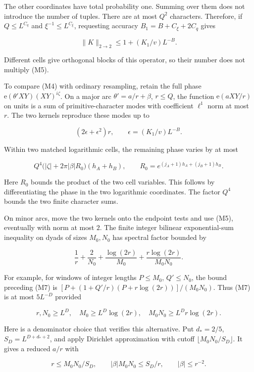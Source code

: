The other coordinates have total probability one. Summing over them does
not introduce the number of tuples. There are at most \(Q^2\)
characters. Therefore, if \(Q\le L^{C_q}\) and
\(\xi^{-1}\le L^{C_\xi}\), requesting accuracy \(B_1=B+C_\xi+2C_q\)
gives

\[
\|K\|_{2\to2}\le1+(K_1/v)L^{-B}. \tag{M5}
\]

Different cells give orthogonal blocks of this operator, so their number
does not multiply (M5).

To compare (M4) with ordinary resampling, retain the full phase
\(\mathrm e(\theta'XY)(XY)^{i\zeta}\). On a major arc
\(\theta'=a/r+\beta\), \(r\le Q\), the function \(\mathrm e(aXY/r)\) on
units is a sum of primitive-character modes with coefficient \(\ell^1\)
norm at most \(r\). The two kernels reproduce these modes up to

\[
(2\epsilon+\epsilon^2)r,
\qquad \epsilon=(K_1/v)L^{-B}.
\]

Within two matched logarithmic cells, the remaining phase varies by at
most

\[
Q^4\bigl(|\zeta|+2\pi|\beta|R_0\bigr)(h_A+h_B),
\qquad R_0=e^{(j_A+1)h_A+(j_B+1)h_B}. \tag{M6}
\]

Here \(R_0\) bounds the product of the two cell variables. This follows
by differentiating the phase in the two logarithmic coordinates. The
factor \(Q^4\) bounds the two finite character sums.

On minor arcs, move the two kernels onto the endpoint tests and use
(M5), eventually with norm at most \(2\). The finite integer bilinear
exponential-sum inequality on dyads of sizes \(M_0,N_0\) has spectral
factor bounded by

\[
\frac1r+\frac2{N_0}+\frac{\log(2r)}{M_0}
       +\frac{r\log(2r)}{M_0N_0}. \tag{M7}
\]

For example, for windows of integer lengths \(P\le M_0\), \(Q'\le N_0\),
the bound preceding (M7) is \([P+(1+Q'/r)(P+r\log(2r))]/(M_0N_0)\). Thus
(M7) is at most \(5L^{-D}\) provided

\[
r,N_0\ge L^D,\quad M_0\ge L^D\log(2r),\quad
M_0N_0\ge L^Dr\log(2r). \tag{M8}
\]

Here is a denominator choice that verifies this alternative. Put
\(d_*=2/5\), \(S_D=L^{D+d_*+2}\), and apply Dirichlet approximation with
cutoff \(\lfloor M_0N_0/S_D\rfloor\). It gives a reduced \(a/r\) with

\[
r\le M_0N_0/S_D,\qquad
|\beta|M_0N_0\le S_D/r,\qquad |\beta|\le r^{-2}.
\]

